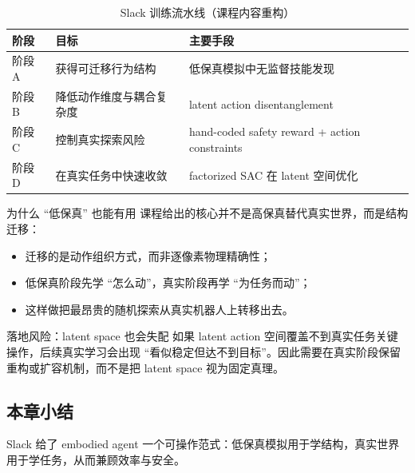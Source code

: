 \begin{table}[H]
\centering
\begin{tabular}{p{2.2cm}p{4.8cm}p{4.8cm}}
\toprule
\textbf{阶段} & \textbf{目标} & \textbf{主要手段} \\
\midrule
阶段 A & 获得可迁移行为结构 & 低保真模拟中无监督技能发现 \\
阶段 B & 降低动作维度与耦合复杂度 & latent action disentanglement \\
阶段 C & 控制真实探索风险 & hand-coded safety reward + action constraints \\
阶段 D & 在真实任务中快速收敛 & factorized SAC 在 latent 空间优化 \\
\bottomrule
\end{tabular}
\caption{Slack 训练流水线（课程内容重构）}
\end{table}

\begin{knowledgebox}{为什么 ``低保真'' 也能有用}
课程给出的核心并不是高保真替代真实世界，而是结构迁移：
\begin{itemize}
    \item 迁移的是动作组织方式，而非逐像素物理精确性；
    \item 低保真阶段先学 ``怎么动''，真实阶段再学 ``为任务而动''；
    \item 这样做把最昂贵的随机探索从真实机器人上转移出去。
\end{itemize}
\end{knowledgebox}

\begin{warningbox}{落地风险：latent space 也会失配}
如果 latent action 空间覆盖不到真实任务关键操作，后续真实学习会出现 ``看似稳定但达不到目标''。因此需要在真实阶段保留重构或扩容机制，而不是把 latent space 视为固定真理。
\end{warningbox}

\subsection{本章小结}
Slack 给了 embodied agent 一个可操作范式：低保真模拟用于学结构，真实世界用于学任务，从而兼顾效率与安全。

